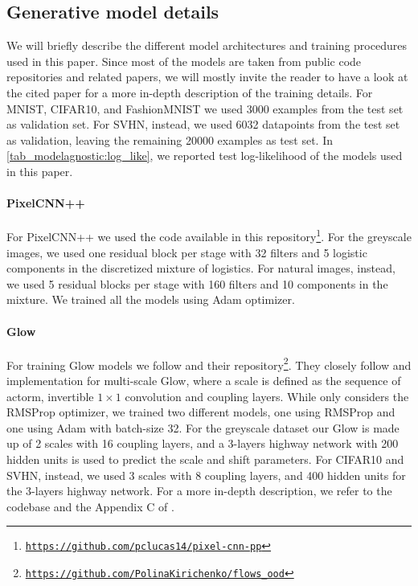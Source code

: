 {\subsection{Generative model details}
We will briefly describe the different model architectures and training procedures used in this paper. Since most of the models are taken from public code repositories and related papers, we will mostly invite the reader to have a look at the cited paper for a more in-depth description of the training details.
For MNIST, CIFAR10, and FashionMNIST we used 3000 examples from the test set as validation set. For SVHN, instead, we used 6032 datapoints from the test set as validation, leaving the remaining 20000 examples as test set. In \cref{tab_modelagnostic:log_like}, we reported test log-likelihood of the models used in this paper. 

\paragraph{PixelCNN++} For PixelCNN++ we used the code available in this repository\footnote{\href{https://github.com/pclucas14/pixel-cnn-pp}{\texttt{https://github.com/pclucas14/pixel-cnn-pp}}}. For the greyscale images, we used one residual block per stage with 32 filters and 5 logistic components in the discretized mixture of logistics. For natural images, instead, we used 5 residual blocks per stage with 160 filters and 10 components in the mixture. We trained all the models using Adam optimizer.

\paragraph{Glow} For training Glow models we follow \textcite{kirichenko_why_2020} and their repository\footnote{\href{https://github.com/PolinaKirichenko/flows_ood}{\texttt{https://github.com/PolinaKirichenko/flows\_ood}}}. They closely follow \textcite{nalisnick_deep_2019} and \cite{kingma_glow_2018} implementation for multi-scale Glow, where a scale is defined as the sequence of actorm, invertible $1\times1$ convolution and coupling layers. While \textcite{kirichenko_why_2020} only considers the RMSProp optimizer, we trained two different models, one using RMSProp and one using Adam with batch-size 32. For the greyscale dataset our Glow is made up of 2 scales with 16 coupling layers, and a 3-layers highway network with 200 hidden units is used to predict the scale and shift parameters. For CIFAR10 and SVHN, instead, we used 3 scales with 8 coupling layers, and 400 hidden units for the 3-layers highway network. %
For a more in-depth description, we refer to the codebase and the Appendix C of \textcite{kirichenko_why_2020}.

}
